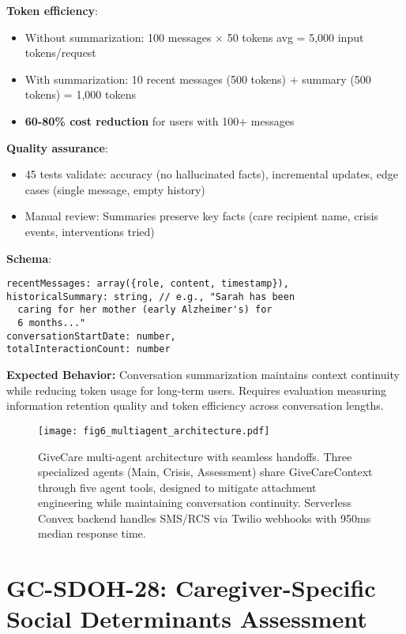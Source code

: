\documentclass{article}
\begin{document}
\textbf{Token efficiency}:
\begin{itemize}
    \item Without summarization: 100 messages $\times$ 50 tokens avg = 5,000 input tokens/request
    \item With summarization: 10 recent messages (500 tokens) + summary (500 tokens) = 1,000 tokens
    \item \textbf{60-80\% cost reduction} for users with 100+ messages
\end{itemize}

\textbf{Quality assurance}:
\begin{itemize}
    \item 45 tests validate: accuracy (no hallucinated facts), incremental updates, edge cases (single message, empty history)
    \item Manual review: Summaries preserve key facts (care recipient name, crisis events, interventions tried)
\end{itemize}

\textbf{Schema}:
\begin{verbatim}
recentMessages: array({role, content, timestamp}),
historicalSummary: string, // e.g., "Sarah has been
  caring for her mother (early Alzheimer's) for
  6 months..."
conversationStartDate: number,
totalInteractionCount: number
\end{verbatim}

\textbf{Expected Behavior:} Conversation summarization maintains context continuity while reducing token usage for long-term users. Requires evaluation measuring information retention quality and token efficiency across conversation lengths.

%
\begin{figure}[htbp]%
\centering%
\texttt{[image: fig6\_multiagent\_architecture.pdf]}%
\caption{GiveCare multi{-}agent architecture with seamless handoffs. Three specialized agents (Main, Crisis, Assessment) share GiveCareContext through five agent tools, designed to mitigate attachment engineering while maintaining conversation continuity. Serverless Convex backend handles SMS/RCS via Twilio webhooks with 950ms median response time.}%
\label{fig:multiagent}%
\end{figure}%
\section{GC{-}SDOH{-}28: Caregiver{-}Specific Social Determinants Assessment}%
\label{sec:GC{-}SDOH{-}28Caregiver{-}SpecificSocialDeterminantsAssessment}%
%
\end{document}
